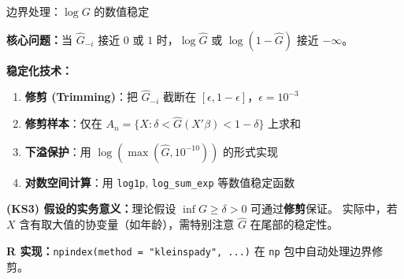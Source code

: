 \documentclass[aspectratio=169, 10pt]{beamer}
\begin{document}
\begin{frame}{边界处理：$\log G$ 的数值稳定}

  \textbf{核心问题：}当 $\hat G_{-i}$ 接近 $0$ 或 $1$ 时，$\log \hat G$ 或 $\log(1 - \hat G)$ 接近 $-\infty$。

  \begin{highlightbox}
    \textbf{稳定化技术：}
    \begin{enumerate}\setlength{\itemsep}{1pt}
      \item \textbf{修剪 (Trimming)}：把 $\hat G_{-i}$ 截断在 $[\epsilon, 1-\epsilon]$，$\epsilon = 10^{-3}$
      \item \textbf{修剪样本}：仅在 $A_n = \{X: \delta < \hat G(X'\beta) < 1-\delta\}$ 上求和
      \item \textbf{下溢保护}：用 $\log(\max(\hat G, 10^{-10}))$ 的形式实现
      \item \textbf{对数空间计算}：用 \texttt{log1p}, \texttt{log\_sum\_exp} 等数值稳定函数
    \end{enumerate}
  \end{highlightbox}

  \begin{keybox}
    \textbf{(KS3) 假设的实务意义：}理论假设 $\inf G \geq \delta > 0$ 可通过\textbf{修剪}保证。
    实际中，若 $X$ 含有取大值的协变量（如年龄），需特别注意 $\hat G$ 在尾部的稳定性。
  \end{keybox}

  \textbf{R 实现：}\texttt{npindex(method = "kleinspady", ...)} 在 \texttt{np} 包中自动处理边界修剪。

\end{frame}
\end{document}

